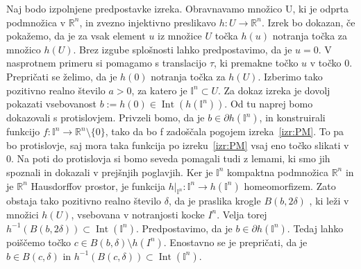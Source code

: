 \documentclass[mat1]{fmfdelo}
\newcommand{\R}{\mathbb R}
\DeclareMathOperator{\Int}{Int}
\newcommand{\I}{\mathbb I}
\newcommand{\0}{0}
\begin{document}
\begin{dokaz}
Naj bodo izpolnjene predpostavke izreka. Obravnavamo množico U, ki je odprta podmnožica v $\R^n$, in zvezno injektivno preslikavo $h : U \rightarrow \R^n$. Izrek bo dokazan, če pokažemo, da je za vsak element $u$ iz množice $U$ točka $h(u)$ notranja točka za množico $h(U)$. Brez izgube splošnosti lahko predpostavimo, da je $u=0$. V nasprotnem primeru si pomagamo s translacijo $\tau$, ki premakne točko $u$ v točko $0$. %
Prepričati se želimo, da je $h(\0)$ notranja točka za $h(U)$. Izberimo tako pozitivno realno število $a > 0$, za katero je $\I^n \subset U$. Za dokaz izreka je dovolj pokazati vsebovanost $b := h(\0) \in \Int(h(\I^n))$. Od tu naprej bomo dokazovali s protislovjem. Privzeli bomo, da je $b \in \partial h(\I^n)$, in konstruirali funkcijo $f : \I^n \to \R^n \setminus \{ \0 \}$, tako da bo f zadoščala pogojem izreka~\ref{izr:PM}. To pa bo protislovje, saj mora taka funkcija po izreku~\ref{izr:PM} vsaj eno točko slikati v $0$. Na poti do protislovja si bomo seveda pomagali tudi z lemami, ki smo jih spoznali in dokazali v prejšnjih poglavjih. Ker je $\I^n$ kompaktna podmnožica $\R^n$ in je $\R^n$ Hausdorffov prostor, je funkcija $h|_{\I^n} : \I^n \to h\left(\I^n  \right)$ homeomorfizem. Zato obstaja tako pozitivno realno število $\delta$, da je praslika krogle $B(b, 2 \delta)$
, ki leži v množici $h(U)$, vsebovana v notranjosti kocke $I^n$. Velja torej $h^{-1}(B(b, 2 \delta)) \subset \Int(\I^n)$. Predpostavimo, da je $b \in \partial h\left(\I^n\right)$. Tedaj lahko poiščemo točko $c \in B(b, \delta) \setminus h(I^n)$. Enostavno se je prepričati, da je $b \in B(c, \delta)$ in $h^{-1} (B(c, \delta)) \subset \Int (\I^n)$.


\end{dokaz}
\end{document}
